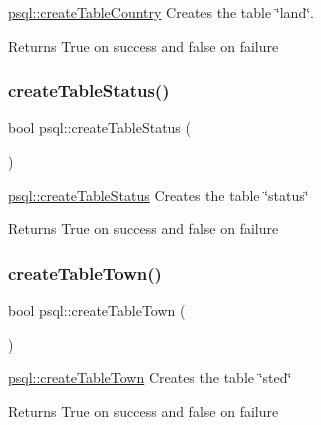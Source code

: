 \mbox{\hyperlink{classpsql_ab6e496d8471f3cd9c5c082a6ba75c25b}{psql\+::create\+Table\+Country}} Creates the table \char`\"{}land\char`\"{}. 

\begin{DoxyReturn}{Returns}
True on success and false on failure 
\end{DoxyReturn}
\mbox{\label{classpsql_a427ad0f483c8ab7a4d23912278bc69e8}} 
\subsubsection{\texorpdfstring{createTableStatus()}{createTableStatus()}}
{\footnotesize\ttfamily bool psql\+::create\+Table\+Status (\begin{DoxyParamCaption}{ }\end{DoxyParamCaption})}



\mbox{\hyperlink{classpsql_a427ad0f483c8ab7a4d23912278bc69e8}{psql\+::create\+Table\+Status}} Creates the table \char`\"{}status\char`\"{} 

\begin{DoxyReturn}{Returns}
True on success and false on failure 
\end{DoxyReturn}
\mbox{\label{classpsql_a95d1f522766174bd2c6a7b94f725719c}} 
\subsubsection{\texorpdfstring{createTableTown()}{createTableTown()}}
{\footnotesize\ttfamily bool psql\+::create\+Table\+Town (\begin{DoxyParamCaption}{ }\end{DoxyParamCaption})}



\mbox{\hyperlink{classpsql_a95d1f522766174bd2c6a7b94f725719c}{psql\+::create\+Table\+Town}} Creates the table \char`\"{}sted\char`\"{} 

\begin{DoxyReturn}{Returns}
True on success and false on failure 
\end{DoxyReturn}
\mbox{\label{classpsql_ad6fb8e1e7177c7996f297d477ecceb27}} 

